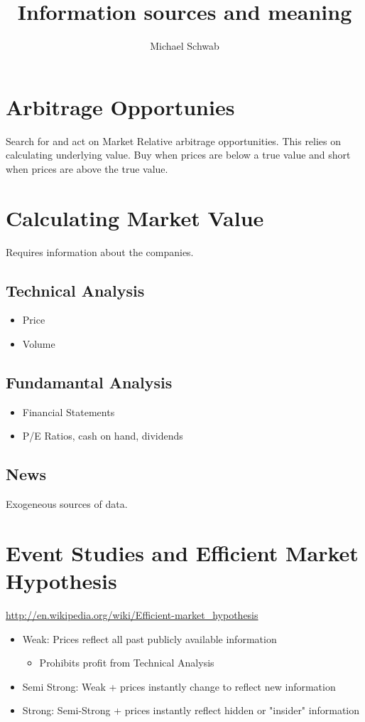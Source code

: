 \documentclass{article}
\title{Information sources and meaning}
\author{Michael Schwab}
\begin{document}
    \section{Arbitrage Opportunies}
    Search for and act on Market Relative arbitrage opportunities.  This relies on calculating underlying value. Buy when prices are below a true value and short when prices are above the true value.
    \section{Calculating Market Value}
    Requires information about the companies.
    \subsection{Technical Analysis}
    \begin{itemize}
        \item Price 
        \item Volume
    \end{itemize}
    \subsection{Fundamantal Analysis}
    \begin{itemize}
        \item Financial Statements
        \item P/E Ratios, cash on hand, dividends
    \end{itemize}
    \subsection{News}
    Exogeneous sources of data.
    \section{Event Studies and Efficient Market Hypothesis}
    \url{http://en.wikipedia.org/wiki/Efficient-market_hypothesis}
    \begin{itemize}
        \item Weak: Prices reflect all past publicly available information
        \begin{itemize}
            \item Prohibits profit from Technical Analysis
        \end{itemize}
        \item Semi Strong: Weak + prices instantly change to reflect new information
        \item Strong: Semi-Strong + prices instantly reflect hidden or "insider" information
    \end{itemize}
\end{document}

